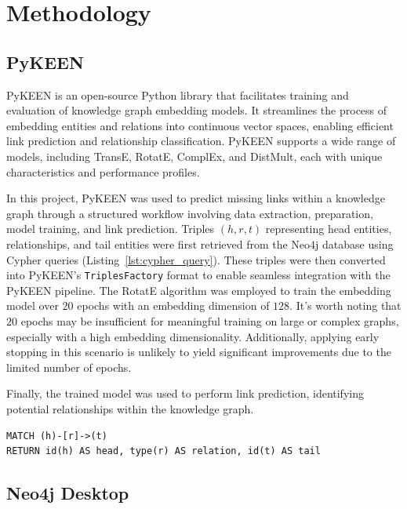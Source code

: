 \section*{Methodology}

\subsection*{PyKEEN}


PyKEEN \cite{pykeen} is an open-source Python library that facilitates training and evaluation of knowledge graph embedding models. It streamlines the process of embedding entities and relations into continuous vector spaces, enabling efficient link prediction and relationship classification. PyKEEN supports a wide range of models, including TransE, RotatE, ComplEx, and DistMult, each with unique characteristics and performance profiles. 


In this project, PyKEEN was used to predict missing links within a knowledge graph through a structured workflow involving data extraction, preparation, model training, and link prediction. Triples $(h, r, t)$ representing head entities, relationships, and tail entities were first retrieved from the Neo4j database using Cypher queries (Listing~\ref{lst:cypher_query}). These triples were then converted into PyKEEN's \texttt{TriplesFactory} format to enable seamless integration with the PyKEEN pipeline. The RotatE algorithm was employed to train the embedding model over $20$ epochs with an embedding dimension of $128$. It's worth noting that $20$ epochs may be insufficient for meaningful training on large or complex graphs, especially with a high embedding dimensionality. Additionally, applying early stopping in this scenario is unlikely to yield significant improvements due to the limited number of epochs.

Finally, the trained model was used to perform link prediction, identifying potential relationships within the knowledge graph.

\begin{lstlisting}[caption=Cypher query to retrieve triples., label=lst:cypher_query]
MATCH (h)-[r]->(t)
RETURN id(h) AS head, type(r) AS relation, id(t) AS tail
\end{lstlisting}

\subsection*{Neo4j Desktop}

